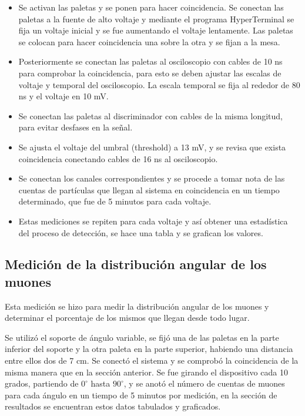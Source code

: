\documentclass[a4paper,10pt]{article}
\numberwithin{equation}{section}
\begin{document}
\begin{itemize}
 \item Se activan las paletas y se ponen para hacer coincidencia. Se conectan las paletas a la fuente de alto voltaje y 
 mediante el programa HyperTerminal se fija un voltaje inicial y se fue aumentando el voltaje lentamente. Las paletas 
 se colocan para hacer coincidencia una sobre la otra y se fijan a la mesa.
 \item Posteriormente se conectan las paletas al osciloscopio con cables de 10 ns  para comprobar la coincidencia, para esto se deben ajustar 
 las escalas de voltaje y temporal del osciloscopio. La escala temporal se fija al rededor de 80 ns y 
 el voltaje en 10 mV.
 \item Se conectan las paletas al discriminador con cables de la misma longitud, para evitar desfases en la señal.
 \item Se ajusta el voltaje del umbral (threshold) a 13 mV, y se revisa que exista coincidencia conectando cables de 
 16 ns al osciloscopio.
 \item Se conectan los canales correspondientes y se procede a tomar nota de las cuentas de partículas que llegan al sistema
 en coincidencia en un tiempo determinado, que fue de 5 minutos para cada voltaje.
 \item Estas mediciones se repiten para cada voltaje y así obtener una estadística del proceso de detección, se hace una tabla y 
 se grafican los valores.
\end{itemize}


\subsection{Medición de la distribución angular de los muones}

Esta medición se hizo para medir la distribución angular de los muones y determinar 
el porcentaje de los mismos que llegan desde todo lugar.

\vspace{.3cm}

Se utilizó el soporte de ángulo variable, se fijó una de las paletas en la parte 
inferior del soporte y la otra paleta en la parte superior, habiendo una distancia 
entre ellos dos de 7 cm. Se conectó el sistema y se comprobó la coincidencia
de la misma manera que en la sección anterior. Se fue girando el dispositivo cada 
10 grados, partiendo de $0^\circ$ hasta $90^\circ$, y se anotó el número de cuentas 
de muones para cada ángulo en un tiempo de 5 minutos por medición, en la sección
de resultados se encuentran estos datos tabulados y graficados.
\end{document}
